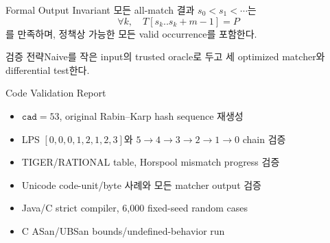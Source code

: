 \begin{frame}{Formal Output Invariant}
모든 all-match 결과 \(s_0<s_1<\cdots\)는
\[
\forall k,\quad T[s_k..s_k+m-1]=P
\]
를 만족하며, 정책상 가능한 모든 valid occurrence를 포함한다.
\begin{alertblock}{검증 전략}Naive를 작은 input의 trusted oracle로 두고 세 optimized matcher와 differential test한다.\end{alertblock}
\end{frame}
\begin{frame}{Code Validation Report}
\small\begin{itemize}
\item \(\texttt{cad}=53\), original Rabin--Karp hash sequence 재생성
\item LPS \([0,0,0,1,2,1,2,3]\)와 \(5\to4\to3\to2\to1\to0\) chain 검증
\item TIGER/RATIONAL table, Horspool mismatch progress 검증
\item Unicode code-unit/byte 사례와 모든 matcher output 검증
\item Java/C strict compiler, 6,000 fixed-seed random cases
\item C ASan/UBSan bounds/undefined-behavior run
\end{itemize}
\end{frame}
